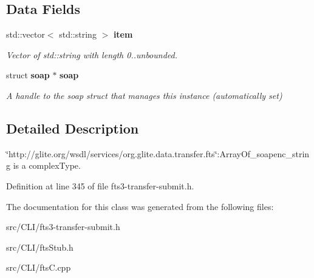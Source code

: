 \subsection*{Data Fields}
\begin{DoxyCompactItemize}
\item 
std::vector$<$ std::string $>$ {\bf item}\label{classfts____ArrayOf__USCOREsoapenc__USCOREstring_abef4aabd2a0f7f81cabf2fc91156d72d}

\begin{DoxyCompactList}\small\item\em Vector of std::string with length 0..unbounded. \item\end{DoxyCompactList}\item 
struct {\bf soap} $\ast$ {\bf soap}\label{classfts____ArrayOf__USCOREsoapenc__USCOREstring_a0312a3f874005cd3716776ec9c55ca8b}

\begin{DoxyCompactList}\small\item\em A handle to the soap struct that manages this instance (automatically set) \item\end{DoxyCompactList}\end{DoxyCompactItemize}


\subsection{Detailed Description}
\char`\"{}http://glite.org/wsdl/services/org.glite.data.transfer.fts\char`\"{}:ArrayOf\_\-soapenc\_\-string is a complexType. 

Definition at line 345 of file fts3-\/transfer-\/submit.h.



The documentation for this class was generated from the following files:\begin{DoxyCompactItemize}
\item 
src/CLI/fts3-\/transfer-\/submit.h\item 
src/CLI/ftsStub.h\item 
src/CLI/ftsC.cpp\end{DoxyCompactItemize}

